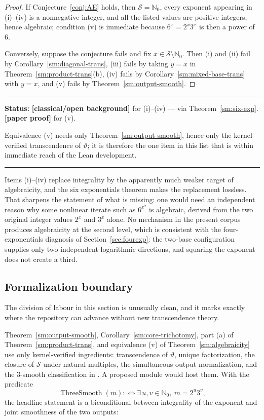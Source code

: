 \documentclass[11pt,oneside]{article}
\theoremstyle{definition}
\theoremstyle{remark}
\newcommand{\Nzero}{\mathbb N_0}
\newcommand{\thetaq}{\vartheta}
\newcommand{\Sol}{\mathcal S}
\newcommand{\lean}[1]{\texttt{\detokenize{#1}}}
\newcommand{\statusnew}{\textcolor{newgreen}{\textbf{[paper proof]}}}
\newcommand{\statusknown}{\textcolor{classicalgray}{\textbf{[classical/open background]}}}
\newenvironment{statusbox}[1]
{\begin{center}\begin{minipage}{0.94\textwidth}\raggedright\hbadness=10000\hrule
\vspace{0.45em}\textbf{Status:} #1\par\vspace{0.35em}}
{\vspace{0.35em}\hrule\end{minipage}\end{center}}
\begin{document}
\begin{proof}
If Conjecture~\ref{conj:AE} holds, then $\Sol=\Nzero$, every exponent appearing in
(i)--(iv) is a nonnegative integer, and all the listed values are positive integers, hence
algebraic; condition (v) is immediate because $6^x=2^x3^x$ is then a power of $6$.

Conversely, suppose the conjecture fails and fix $x\in\Sol\setminus\Nzero$.  Then (i) and
(ii) fail by Corollary~\ref{sm:diagonal-trans}, (iii) fails by taking $y=x$ in
Theorem~\ref{sm:product-trans}(b), (iv) fails by Corollary~\ref{sm:mixed-base-trans} with
$y=x$, and (v) fails by Theorem~\ref{sm:output-smooth}.
\end{proof}

\begin{statusbox}{\statusknown{} for (i)--(iv) --- via Theorem~\ref{sm:six-exp}.
\statusnew{} for (v).}
Equivalence (v) needs only Theorem~\ref{sm:output-smooth}, hence only the kernel-verified
transcendence of $\thetaq$; it is therefore the one item in this list that is within
immediate reach of the Lean development.
\end{statusbox}

Items (i)--(iv) replace integrality by the apparently much weaker target of algebraicity, and
the six exponentials theorem makes the replacement lossless.  That sharpens the statement of
what is missing: one would need an independent reason why some nonlinear iterate such as
$6^{x^2}$ is algebraic, derived from the two original integer values $2^x$ and $3^x$ alone.
No mechanism in the present corpus produces algebraicity at the second level, which is
consistent with the four-exponentials diagnosis of Section~\ref{sec:fourexp}: the two-base
configuration supplies only two independent logarithmic directions, and squaring the exponent
does not create a third.

\subsection{Formalization boundary}

The division of labour in this section is unusually clean, and it marks exactly where the
repository can advance without new transcendence theory.

Theorem~\ref{sm:output-smooth}, Corollary~\ref{sm:core-trichotomy}, part (a) of
Theorem~\ref{sm:product-trans}, and equivalence (v) of Theorem~\ref{sm:algebraicity} use only
kernel-verified ingredients: transcendence of $\thetaq$, unique factorization, the closure of
$\Sol$ under natural multiples, the simultaneous output normalization, and the $3$-smooth
classification in \lean{ThreeSmooth}.  A proposed module \lean{OutputSmoothness} would host
them.  With the predicate
\[
 \operatorname{ThreeSmooth}(m):\Longleftrightarrow\exists\,u,v\in\Nzero,\ m=2^u3^v,
\]
the headline statement is a biconditional between integrality of the exponent and joint
smoothness of the two outputs:
\end{document}
